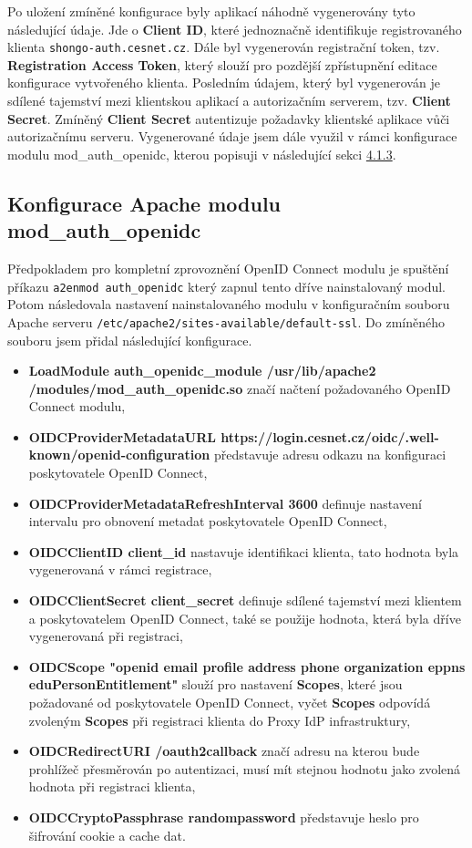 \documentclass[
  printed, %
  twoside, %
  table,   %
  nolof,     %
  nolot,     %
]{fithesis3}
\begin{document}
Po uložení zmíněné konfigurace byly aplikací náhodně vygenerovány tyto následující údaje. Jde o \textbf{Client ID}, které jednoznačně identifikuje registrovaného klienta \texttt{shongo-auth.cesnet.cz}. Dále byl vygenerován registrační token, tzv. \textbf{Registration Access Token}, který slouží pro pozdější zpřístupnění editace konfigurace vytvořeného klienta. Posledním údajem, který byl vygenerován je sdílené tajemství mezi klientskou aplikací a autorizačním serverem, tzv. \textbf{Client Secret}. Zmíněný \textbf{Client Secret} autentizuje požadavky klientské aplikace vůči autorizačnímu serveru. Vygenerované údaje jsem dále využil v rámci konfigurace modulu mod\_auth\_openidc, kterou popisuji v následující sekci \hyperref[sec:mod-conf]{4.1.3}.

\subsection{Konfigurace Apache modulu mod\_auth\_openidc} 
\label{sec:mod-conf}
Předpokladem pro kompletní zprovoznění OpenID Connect modulu je spuštění příkazu \texttt{a2enmod auth\_openidc} který zapnul tento dříve nainstalovaný modul. Potom následovala nastavení nainstalovaného modulu v konfiguračním souboru Apache serveru \texttt{/etc/apache2/sites-available/default-ssl}. Do zmíněného souboru jsem přidal následující konfigurace.

\begin{itemize}
    \item \textbf{LoadModule auth\_openidc\_module /usr/lib/apache2\\ /modules/mod\_auth\_openidc.so} značí načtení požadovaného OpenID Connect modulu, 
    \item \textbf{OIDCProviderMetadataURL https://login.cesnet.cz/oidc/.well-known/openid-configuration} představuje adresu odkazu na konfiguraci poskytovatele OpenID Connect, 
    \item \textbf{OIDCProviderMetadataRefreshInterval 3600} definuje nastavení intervalu pro obnovení metadat poskytovatele OpenID Connect, 
    \item \textbf{OIDCClientID client\_id} nastavuje identifikaci klienta, tato hodnota byla vygenerovaná v rámci registrace,
    \item \textbf{OIDCClientSecret client\_secret} definuje sdílené tajemství mezi klientem a poskytovatelem OpenID Connect, také se použije hodnota, která byla dříve vygenerovaná při registraci,
    \item \textbf{OIDCScope "openid email profile address phone organization eppns eduPersonEntitlement"} slouží pro nastavení \textbf{Scopes}, které jsou požadované od poskytovatele OpenID Connect, vyčet \textbf{Scopes} odpovídá zvoleným \textbf{Scopes} při registraci klienta do Proxy IdP infrastruktury,
    \item \textbf{OIDCRedirectURI /oauth2callback} značí adresu na kterou bude prohlížeč přesměrován po autentizaci, musí mít stejnou hodnotu jako zvolená hodnota při registraci klienta, 
    \item \textbf{OIDCCryptoPassphrase randompassword} představuje heslo pro šifrování cookie a cache dat. 
\end{itemize}
\end{document}
